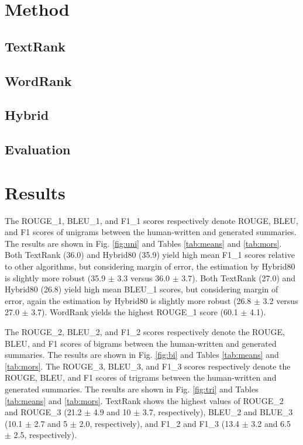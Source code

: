 \documentclass[11pt]{article}
\begin{document}
\section{Method}
\subsection{TextRank}
\subsection{WordRank}
\subsection{Hybrid}
\subsection{Evaluation}

\section{Results}

The ROUGE\_1, BLEU\_1, and F1\_1 scores respectively denote ROUGE, BLEU, and F1 scores of unigrams between the human-written and generated summaries. The results are shown in Fig. \ref{fig:uni} and Tables \ref{tab:means} and \ref{tab:mors}. Both TextRank (36.0) and Hybrid80 (35.9) yield high mean F1\_1 scores relative to other algorithms, but considering margin of error, the estimation by Hybrid80 is slightly more robust (35.9 $\pm$ 3.3 versus 36.0 $\pm$ 3.7). Both TextRank (27.0) and Hybrid80 (26.8) yield high mean BLEU\_1 scores, but considering margin of error, again the estimation by Hybrid80 is slightly more robust (26.8 $\pm$ 3.2 versus 27.0 $\pm$ 3.7). WordRank yields the highest ROUGE\_1 score (60.1 $\pm$ 4.1). 

The ROUGE\_2, BLEU\_2, and F1\_2 scores respectively denote the ROUGE, BLEU, and F1 scores of bigrams between the human-written and generated summaries. The results are shown in Fig. \ref{fig:bi} and Tables \ref{tab:means} and \ref{tab:mors}. The ROUGE\_3, BLEU\_3, and F1\_3 scores respectively denote the ROUGE, BLEU, and F1 scores of trigrams between the human-written and generated summaries. The results are shown in Fig. \ref{fig:tri} and Tables \ref{tab:means} and \ref{tab:mors}. TextRank shows the highest values of ROUGE\_2 and ROUGE\_3 (21.2 $\pm$ 4.9 and 10 $\pm$ 3.7, respectively), BLEU\_2 and BLUE\_3 (10.1 $\pm$ 2.7 and 5 $\pm$ 2.0, respectively), and F1\_2 and F1\_3 (13.4 $\pm$ 3.2 and 6.5 $\pm$ 2.5, respectively).
\end{document}
